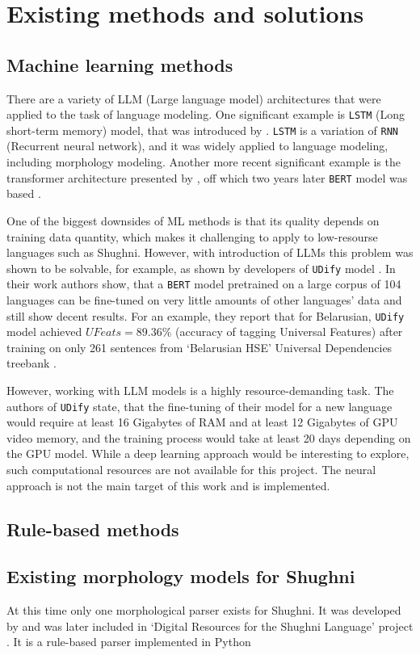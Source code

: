 \section{Existing methods and solutions}

\subsection{Machine learning methods} \label{dl_methods}
There are a variety of LLM (Large language model) architectures that were applied to the task of language modeling. One significant example is \texttt{LSTM} (Long short-term memory) model, that was introduced by \textcite{lstm_1997}. \texttt{LSTM} is a variation of \texttt{RNN} (Recurrent neural network), and it was widely applied to language modeling, including morphology modeling. Another more recent significant example is the transformer architecture presented by \textcite{transformer_2017}, off which two years later \texttt{BERT} model was based \parencite{devlin_2019}. 

One of the biggest downsides of ML methods is that its quality depends on training data quantity, which makes it challenging to apply to low-resourse languages such as Shughni. However, with introduction of LLMs this problem was shown to be solvable, for example, as shown by developers of \texttt{UDify} model \parencite{kondratyuk_straka_model_2019}. In their work authors show, that a \texttt{BERT} model pretrained on a large corpus of 104 languages can be fine-tuned on very little amounts of other languages' data and still show decent results. For an example, they report that for Belarusian, \texttt{UDify} model achieved $UFeats=89.36\%$ (accuracy of tagging Universal Features) after training on only 261 sentences from `Belarusian HSE' Universal Dependencies treebank \parencite[Table 7]{kondratyuk_straka_model_2019}.

However, working with LLM models is a highly resource-demanding task. The authors of \texttt{UDify} state, that the fine-tuning of their model for a new language would require at least 16 Gigabytes of RAM and at least 12 Gigabytes of GPU video memory, and the training process would take at least 20 days depending on the GPU model. While a deep learning approach would be interesting to explore, such computational resources are not available for this project. The neural approach is not the main target of this work and is implemented. 

\subsection{Rule-based methods}


\subsection{Existing morphology models for Shughni}
At this time only one morphological parser exists for Shughni. It was developed by \textcite{melenchenko_2021_parser} and was later included in `Digital Resources for the Shughni Language' project \parencite{makarov_digital_2022}. It is a rule-based parser implemented in Python